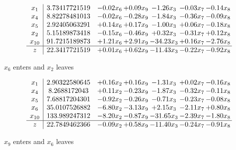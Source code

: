 \documentclass[8pt]{article}
\begin{document}
 \[\begin{array}{c| c c@{\hskip 2pt} c@{\hskip 2pt} c@{\hskip 2pt} c@{\hskip 2pt} c@{\hskip 2pt} }
 x_{1}   &  3.73417721519 & -0.02 x_{6} & +  0.09 x_{9} & -1.26 x_{3} & -0.03 x_{7} & -0.14 x_{8}\\
 x_{4}   &  8.82278481013 & -0.02 x_{6} & -0.28 x_{9} & -1.84 x_{3} & -0.36 x_{7} & -0.09 x_{8}\\
 x_{5}   &  2.92405063291 & +  0.14 x_{6} & +  0.17 x_{9} & -1.00 x_{3} & +  0.06 x_{7} & -0.18 x_{8}\\
 x_{2}   &  5.15189873418 & -0.15 x_{6} & -0.46 x_{9} & +  0.32 x_{3} & -0.31 x_{7} & +  0.12 x_{8}\\
 x_{10}   &  91.7215189873 & +  1.21 x_{6} & +  2.91 x_{9} & -34.23 x_{3} & +  0.16 x_{7} & -2.76 x_{8}\\
\hline
z    &  22.3417721519 & +  0.01 x_{6} & +  0.62 x_{9} & -11.43 x_{3} & -0.22 x_{7} & -0.92 x_{8}\\
\end{array}\]


 $ x_{6} $ enters and $ x_{2} $ leaves 

 \[\begin{array}{c| c c@{\hskip 2pt} c@{\hskip 2pt} c@{\hskip 2pt} c@{\hskip 2pt} c@{\hskip 2pt} }
 x_{1}   &  2.90322580645 & +  0.16 x_{2} & +  0.16 x_{9} & -1.31 x_{3} & +  0.02 x_{7} & -0.16 x_{8}\\
 x_{4}   &  8.2688172043 & +  0.11 x_{2} & -0.23 x_{9} & -1.87 x_{3} & -0.32 x_{7} & -0.11 x_{8}\\
 x_{5}   &  7.68817204301 & -0.92 x_{2} & -0.26 x_{9} & -0.71 x_{3} & -0.23 x_{7} & -0.08 x_{8}\\
 x_{6}   &  35.0107526882 & -6.80 x_{2} & -3.13 x_{9} & +  2.15 x_{3} & -2.11 x_{7} & +  0.80 x_{8}\\
 x_{10}   &  133.989247312 & -8.20 x_{2} & -0.87 x_{9} & -31.65 x_{3} & -2.39 x_{7} & -1.80 x_{8}\\
\hline
z    &  22.7849462366 & -0.09 x_{2} & +  0.58 x_{9} & -11.40 x_{3} & -0.24 x_{7} & -0.91 x_{8}\\
\end{array}\]


 $ x_{9} $ enters and $ x_{6} $ leaves 
\end{document}
